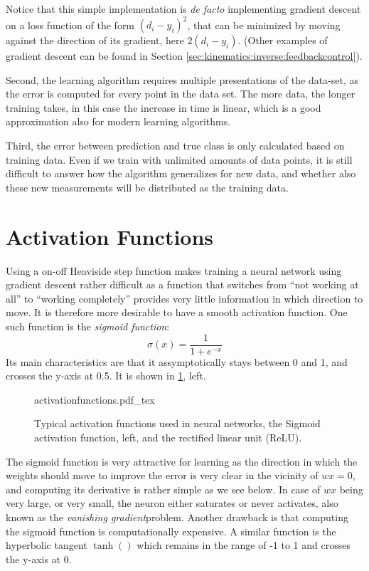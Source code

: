 Notice that this simple implementation is \emph{de facto} implementing gradient descent  on a loss function of the form $(d_i-y_i)^2$, that can be minimized by moving against the direction of its gradient, here $2(d_i-y_i)$. (Other examples of gradient descent can be found in Section \ref{sec:kinematics:inverse:feedbackcontrol}).

Second, the learning algorithm requires multiple presentations of the data-set, as the error is computed for every point in the data set. The more data, the longer training takes, in this case the increase in time is linear, which is a good approximation also for modern learning algorithms.

Third, the error between prediction and true class is only calculated based on training data. Even if we train with unlimited amounts of data points, it is still difficult to answer how the algorithm generalizes for new data, and whether also these new measurements will be distributed as the training data.

\section{Activation Functions}
Using a on-off Heaviside step function makes training a neural network using gradient descent rather difficult as a function that switches from ``not working at all'' to ``working completely'' provides very little information in which direction to move. It is therefore more desirable to have a smooth activation function. One such function is the \textsl{sigmoid function}:
\begin{equation}
\sigma(x)=\frac{1}{1+e^{-x}}
\end{equation}
Its main characteristics are that it assymptotically stays between 0 and 1, and crosses the y-axis at 0.5. It is shown in \cref{fig:activationfunctions}, left.

\begin{figure}[htb]
    \centering
    \def\svgwidth{0.9\textwidth}
    {activationfunctions.pdf_tex}
    \caption{Typical activation functions used in neural networks, the Sigmoid activation function, left, and the rectified linear unit (ReLU).\label{fig:activationfunctions}}
\end{figure}

The sigmoid function is very attractive for learning as the direction in which the weights should move to improve the error is very clear in the vicinity of $wx=0$, and computing its derivative is rather simple as we see below. In case of $wx$ being very large, or very small, the neuron either saturates or never activates, also known as the \textsl{vanishing gradient}problem. Another drawback is that computing the sigmoid function is computationally expensive. A similar function is the hyperbolic tangent $\tanh()$ which remains in the range of -1 to 1 and crosses the y-axis at 0.

